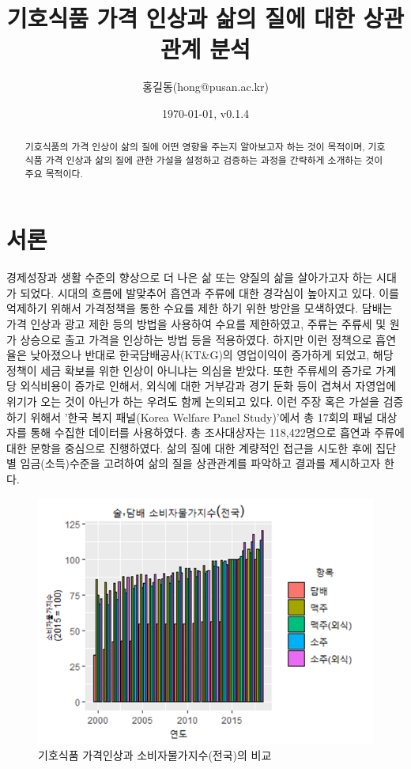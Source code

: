 \documentclass[a4paper, amsmath]{oblivoir}
\begin{document}
\title{기호식품 가격 인상과 삶의 질에 대한 상관관계 분석}
\author{홍길동(hong@pusan.ac.kr)}
\date{\today, v0.1.4}

\maketitle

\begin{abstract}
기호식품의 가격 인상이 삶의 질에 어떤 영향을 주는지 알아보고자 하는 것이 목적이며, 
기호식품 가격 인상과 삶의 질에 관한 가설을 설정하고 검증하는 과정을 간략하게 소개하는 것이 주요 목적이다.
\end{abstract}

\tableofcontents*

\section{서론}

경제성장과 생활 수준의 향상으로 더 나은 삶 또는 양질의 삶을 살아가고자 하는 시대가 되었다.
시대의 흐름에 발맞추어 흡연과 주류에 대한 경각심이 높아지고 있다. 
이를 억제하기 위해서 가격정책을 통한 수요를 제한 하기 위한 방안을 모색하였다. 
담배는 가격 인상과 광고 제한 등의 방법을 사용하여 수요를 제한하였고, 주류는 주류세 및 원가 상승으로 출고 가격을 인상하는 방법 등을 적용하였다.
하지만 이런 정책으로 흡연율은 낮아졌으나 반대로 한국담배공사(KT\&G)의 영업이익이 증가하게 되었고, 해당 정책이 세금 확보를 위한 인상이 아니냐는 의심을 받았다.
또한 주류세의 증가로 가계당 외식비용이 증가로 인해서, 외식에 대한 거부감과 경기 둔화 등이 겹쳐서 자영업에 위기가 오는 것이 아닌가 하는 우려도 함께 논의되고 있다.
이런 주장 혹은 가설을 검증하기 위해서 '한국 복지 패널(Korea Welfare Panel Study)'에서 총 17회의 패널 대상자를 통해 수집한 데이터를 사용하였다.
총 조사대상자는 118,422명으로 흡연과 주류에 대한 문항을 중심으로 진행하였다. 
삶의 질에 대한 계량적인 접근을 시도한 후에 집단별 임금(소득)수준을 고려하여 삶의 질을 상관관계를 파악하고 결과를 제시하고자 한다.

\begin{figure}
    \begin{center}    
    \includegraphics[width=0.8\linewidth]{./figz/image01.png}
    \end{center}    
    \caption{기호식품 가격인상과 소비자물가지수(전국)의 비교 }    
    \label{fig:long}    
    \label{fig:onecol}    
\end{figure}
\end{document}
